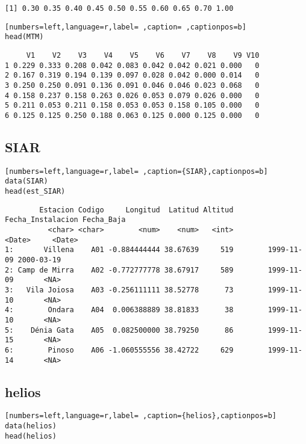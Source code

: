 \begin{verbatim}
[1] 0.30 0.35 0.40 0.45 0.50 0.55 0.60 0.65 0.70 1.00
\end{verbatim}


\begin{lstlisting}[numbers=left,language=r,label= ,caption= ,captionpos=b]
head(MTM)
\end{lstlisting}

\begin{verbatim}
     V1    V2    V3    V4    V5    V6    V7    V8    V9 V10
1 0.229 0.333 0.208 0.042 0.083 0.042 0.042 0.021 0.000   0
2 0.167 0.319 0.194 0.139 0.097 0.028 0.042 0.000 0.014   0
3 0.250 0.250 0.091 0.136 0.091 0.046 0.046 0.023 0.068   0
4 0.158 0.237 0.158 0.263 0.026 0.053 0.079 0.026 0.000   0
5 0.211 0.053 0.211 0.158 0.053 0.053 0.158 0.105 0.000   0
6 0.125 0.125 0.250 0.188 0.063 0.125 0.000 0.125 0.000   0
\end{verbatim}

\subsection{SIAR}
\label{sec:org4744b6d}
\begin{lstlisting}[numbers=left,language=r,label= ,caption={SIAR},captionpos=b]
data(SIAR)
head(est_SIAR)
\end{lstlisting}

\begin{verbatim}
        Estacion Codigo     Longitud  Latitud Altitud Fecha_Instalacion Fecha_Baja
          <char> <char>        <num>    <num>   <int>            <Date>     <Date>
1:       Villena    A01 -0.884444444 38.67639     519        1999-11-09 2000-03-19
2: Camp de Mirra    A02 -0.772777778 38.67917     589        1999-11-09       <NA>
3:   Vila Joiosa    A03 -0.256111111 38.52778      73        1999-11-10       <NA>
4:        Ondara    A04  0.006388889 38.81833      38        1999-11-10       <NA>
5:    Dénia Gata    A05  0.082500000 38.79250      86        1999-11-15       <NA>
6:        Pinoso    A06 -1.060555556 38.42722     629        1999-11-14       <NA>
\end{verbatim}

\subsection{helios}
\label{sec:org0795290}
\begin{lstlisting}[numbers=left,language=r,label= ,caption={helios},captionpos=b]
data(helios)
head(helios)
\end{lstlisting}

